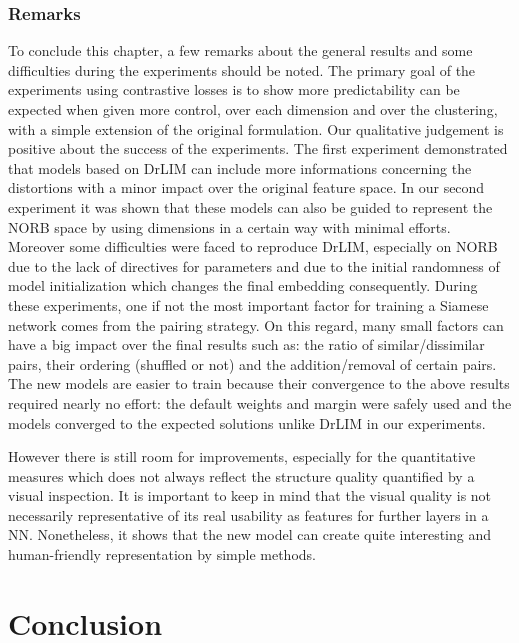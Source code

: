 \documentclass[a4paper,12pt]{report}
\begin{document}
\subsection{Remarks}
To conclude this chapter, a few remarks about the general results and some difficulties during the experiments should be noted.
The primary goal of the experiments using contrastive losses is to show more predictability can be expected when given more control, over each dimension and over the clustering, with a simple extension of the original formulation.
Our qualitative judgement is positive about the success of the experiments.
The first experiment demonstrated that models based on DrLIM can include more informations concerning the distortions with a minor impact over the original feature space.
In our second experiment it was shown that these models can also be guided to represent the NORB space by using dimensions in a certain way with minimal efforts.
Moreover some difficulties were faced to reproduce DrLIM, especially on NORB due to the lack of directives for parameters and due to the initial randomness of model initialization which changes the final embedding consequently.
During these experiments, one if not the most important factor for training a Siamese network comes from the pairing strategy.
On this regard, many small factors can have a big impact over the final results such as: the ratio of similar/dissimilar pairs, their ordering (shuffled or not) and the addition/removal of certain pairs.
The new models are easier to train because their convergence to the above results required nearly no effort: the default weights and margin were safely used and the models converged to the expected solutions unlike DrLIM in our experiments.

However there is still room for improvements, especially for the quantitative measures which does not always reflect the structure quality quantified by a visual inspection.
It is important to keep in mind that the visual quality is not necessarily representative of its real usability as features for further layers in a NN.
Nonetheless, it shows that the new model can create quite interesting and human-friendly representation by simple methods.


\chapter{Conclusion}
\label{chap:conclusion}
\end{document}
